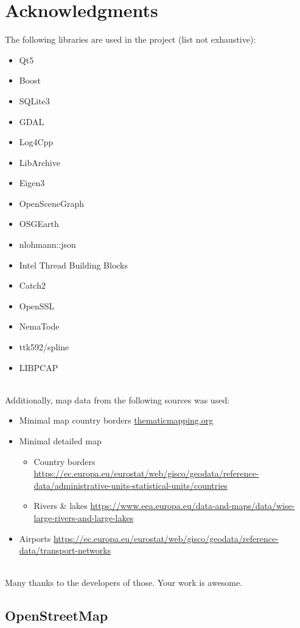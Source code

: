  \section{Acknowledgments}

The following libraries are used in the project (list not exhaustive):

\begin{itemize}  
\item Qt5
\item Boost
\item SQLite3
\item GDAL
\item Log4Cpp
\item LibArchive
\item Eigen3
\item OpenSceneGraph
\item OSGEarth
\item nlohmann::json
\item Intel Thread Building Blocks
\item Catch2
\item OpenSSL
\item NemaTode
\item ttk592/spline
\item LIBPCAP
\end{itemize}
\ \\

Additionally, map data from the following sources was used:
\begin{itemize}  
\item Minimal map country borders \url{thematicmapping.org}
\item Minimal detailed map
\begin{itemize} 
\item Country borders \url{https://ec.europa.eu/eurostat/web/gisco/geodata/reference-data/administrative-units-statistical-units/countries}
\item Rivers \& lakes \url{https://www.eea.europa.eu/data-and-maps/data/wise-large-rivers-and-large-lakes}
\end{itemize}
\item Airports \url{https://ec.europa.eu/eurostat/web/gisco/geodata/reference-data/transport-networks}
\end{itemize}
\ \\

Many thanks to the developers of those. Your work is awesome.

\subsection{OpenStreetMap}

